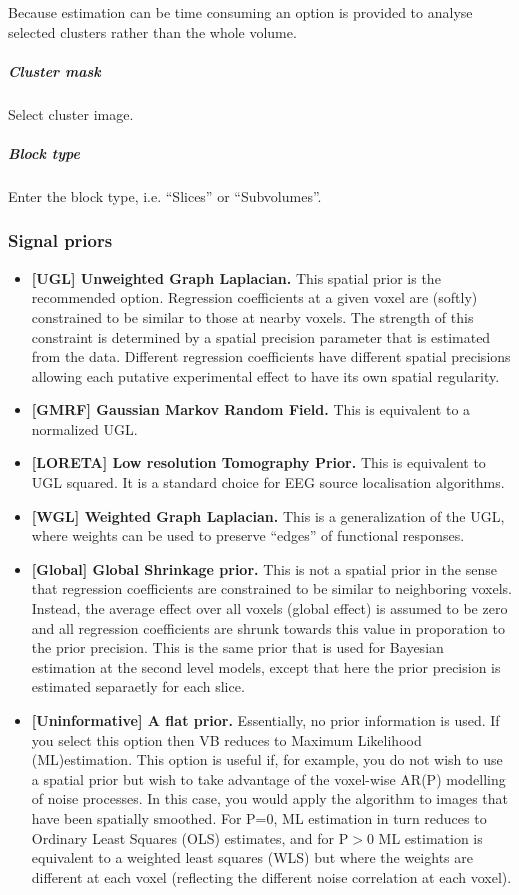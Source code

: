 Because estimation can be time consuming an option is provided to analyse selected clusters rather than the whole volume.

\subparagraph{Cluster mask}

Select cluster image.

\subparagraph{Block type}

Enter the block type, i.e. ``Slices'' or ``Subvolumes''.

\subsubsection{Signal priors}
\begin{itemize}
\item \textbf{[UGL] Unweighted Graph Laplacian.} This spatial prior is the recommended option. Regression coefficients at a given voxel are (softly) constrained to be similar to those at nearby voxels. The strength of this constraint is determined by a spatial precision parameter that is estimated from the data. Different regression coefficients have different spatial precisions allowing each putative experimental effect to have its own spatial regularity. 

\item \textbf{[GMRF] Gaussian Markov Random Field.} This is equivalent to a normalized UGL.

\item \textbf{[LORETA] Low resolution Tomography Prior.} This is equivalent to UGL squared. It is a standard choice for EEG source localisation algorithms.

\item \textbf{[WGL] Weighted Graph Laplacian.} This is a generalization of the UGL, where weights can be used to preserve ``edges'' of functional responses.

\item \textbf{[Global] Global Shrinkage prior.} This is not a spatial prior in the sense that regression coefficients are constrained to be similar to neighboring voxels. Instead, the average effect over all voxels (global effect) is assumed to be zero and all regression coefficients are shrunk towards this value in proporation to the prior precision. This is the same prior that is used for Bayesian estimation at the second level models, except that here the prior precision is estimated separaetly for each slice.

\item \textbf{[Uninformative] A flat prior.} Essentially, no prior information is used. If you select this option then VB reduces to Maximum Likelihood (ML)estimation. This option is useful if, for example, you do not wish to use a spatial prior but wish to take advantage of the voxel-wise AR(P) modelling of noise processes. In this case, you would apply the algorithm to images that have been spatially smoothed. For P=0, ML estimation in turn reduces to Ordinary Least Squares (OLS) estimates, and for P$>$0 ML estimation is equivalent to a weighted least squares (WLS) but where the weights are different at each voxel (reflecting the different noise correlation at each voxel).
\end{itemize}

